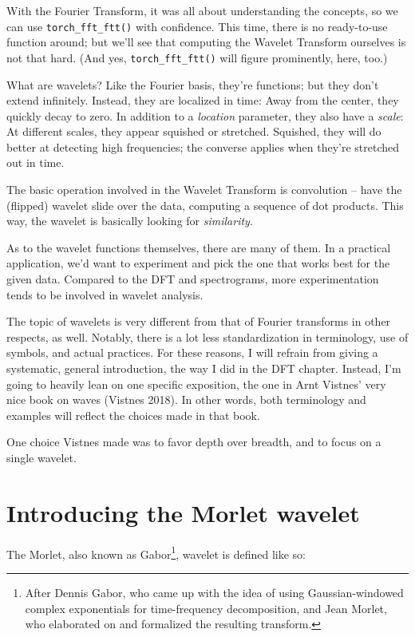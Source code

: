 \documentclass[
  letterpaper,
]{krantz}
\begin{document}
With the Fourier Transform, it was all about understanding the concepts,
so we can use \texttt{torch\_fft\_ftt()} with confidence. This time,
there is no ready-to-use function around; but we'll see that computing
the Wavelet Transform ourselves is not that hard. (And yes,
\texttt{torch\_fft\_ftt()} will figure prominently, here, too.)

What are wavelets? Like the Fourier basis, they're functions; but they
don't extend infinitely. Instead, they are localized in time: Away from
the center, they quickly decay to zero. In addition to a \emph{location}
parameter, they also have a \emph{scale}: At different scales, they
appear squished or stretched. Squished, they will do better at detecting
high frequencies; the converse applies when they're stretched out in
time.

The basic operation involved in the Wavelet Transform is convolution --
have the (flipped) wavelet slide over the data, computing a sequence of
dot products. This way, the wavelet is basically looking for
\emph{similarity}.

As to the wavelet functions themselves, there are many of them. In a
practical application, we'd want to experiment and pick the one that
works best for the given data. Compared to the DFT and spectrograms,
more experimentation tends to be involved in wavelet analysis.

The topic of wavelets is very different from that of Fourier transforms
in other respects, as well. Notably, there is a lot less standardization
in terminology, use of symbols, and actual practices. For these reasons,
I will refrain from giving a systematic, general introduction, the way I
did in the DFT chapter. Instead, I'm going to heavily lean on one
specific exposition, the one in Arnt Vistnes' very nice book on waves
(Vistnes 2018). In other words, both terminology and examples will
reflect the choices made in that book.

One choice Vistnes made was to favor depth over breadth, and to focus on
a single wavelet.

\hypertarget{introducing-the-morlet-wavelet}{%
\section{\texorpdfstring{Introducing the Morlet
wavelet}{Introducing the Morlet wavelet}}\label{introducing-the-morlet-wavelet}}

The Morlet, also known as Gabor\footnote{After Dennis Gabor, who came up
  with the idea of using Gaussian-windowed complex exponentials for
  time-frequency decomposition, and Jean Morlet, who elaborated on and
  formalized the resulting transform.}, wavelet is defined like so:
\end{document}

